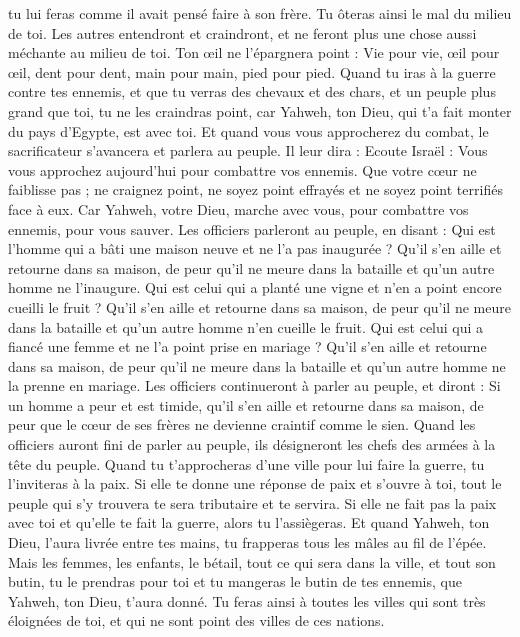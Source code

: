 \begin{multicols}{2}
tu lui feras comme il avait pensé faire à son frère. Tu ôteras ainsi le mal du milieu de toi.
Les autres entendront et craindront, et ne feront plus une chose aussi méchante au milieu de toi.
Ton œil ne l'épargnera point : Vie pour vie, œil pour œil, dent pour dent, main pour main, pied pour pied.
\VerseOne{}Quand tu iras à la guerre contre tes ennemis, et que tu verras des chevaux et des chars, et un peuple plus grand que toi, tu ne les craindras point, car Yahweh, ton Dieu, qui t'a fait monter du pays d'Egypte, est avec toi.
Et quand vous vous approcherez du combat, le sacrificateur s'avancera et parlera au peuple.
Il leur dira : Ecoute Israël : Vous vous approchez aujourd'hui pour combattre vos ennemis. Que votre cœur ne faiblisse pas ; ne craignez point, ne soyez point effrayés et ne soyez point terrifiés face à eux.
Car Yahweh, votre Dieu, marche avec vous, pour combattre vos ennemis, pour vous sauver.
Les officiers parleront au peuple, en disant : Qui est l’homme qui a bâti une maison neuve et ne l'a pas inaugurée ? Qu'il s'en aille et retourne dans sa maison, de peur qu'il ne meure dans la bataille et qu'un autre homme ne l’inaugure.
Qui est celui qui a planté une vigne et n'en a point encore cueilli le fruit ? Qu’il s'en aille et retourne dans sa maison, de peur qu'il ne meure dans la bataille et qu'un autre homme n’en cueille le fruit.
Qui est celui qui a fiancé une femme et ne l'a point prise en mariage ? Qu’il s'en aille et retourne dans sa maison, de peur qu'il ne meure dans la bataille et qu'un autre homme ne la prenne en mariage.
Les officiers continueront à parler au peuple, et diront : Si un homme a peur et est timide, qu'il s'en aille et retourne dans sa maison, de peur que le cœur de ses frères ne devienne craintif comme le sien.
Quand les officiers auront fini de parler au peuple, ils désigneront les chefs des armées à la tête du peuple.
Quand tu t'approcheras d'une ville pour lui faire la guerre, tu l’inviteras à la paix.
Si elle te donne une réponse de paix et s’ouvre à toi, tout le peuple qui s’y trouvera te sera tributaire et te servira.
Si elle ne fait pas la paix avec toi et qu'elle te fait la guerre, alors tu l’assiègeras.
Et quand Yahweh, ton Dieu, l'aura livrée entre tes mains, tu frapperas tous les mâles au fil de l’épée.
Mais les femmes, les enfants, le bétail, tout ce qui sera dans la ville, et tout son butin, tu le prendras pour toi et tu mangeras le butin de tes ennemis, que Yahweh, ton Dieu, t'aura donné.
Tu feras ainsi à toutes les villes qui sont très éloignées de toi, et qui ne sont point des villes de ces nations.

\end{multicols}
